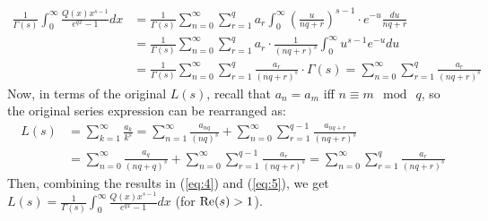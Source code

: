 \documentclass{article}
\begin{document}
\begin{equation}
    \label{eq:4}
    \begin{split}
        \frac{1}{\Gamma(s)}\int_{0}^{\infty}\frac{Q(x)x^{s-1}}{e^{qx}-1}dx &= \frac{1}{\Gamma(s)}\sum_{n=0}^{\infty}\sum_{r=1}^{q}a_r\int_{0}^{\infty}\left(\frac{u}{nq+r}\right)^{s-1}\cdot e^{-u}\frac{du}{nq+r}\\
        &= \frac{1}{\Gamma(s)}\sum_{n=0}^{\infty}\sum_{r=1}^{q}a_r\cdot\frac{1}{(nq+r)^s}\int_{0}^{\infty}u^{s-1}e^{-u}du\\
        &= \frac{1}{\Gamma(s)}\sum_{n=0}^{\infty}\sum_{r=1}^{q}\frac{a_{r}}{(nq+r)^s}\cdot\Gamma(s) = \sum_{n=0}^{\infty}\sum_{r=1}^{q}\frac{a_{r}}{(nq+r)^s}
    \end{split}
\end{equation}
Now, in terms of the original $L(s)$, recall that $a_n=a_m$ iff $n\equiv m\mod\ q$, so the original series expression can be rearranged as:
\begin{equation}
    \label{eq:5}
    \begin{split}
        L(s)&=\sum_{k=1}^{\infty}\frac{a_k}{k^s} = \sum_{n=1}^{\infty}\frac{a_{nq}}{(nq)^s}+\sum_{n=0}^{\infty}\sum_{r=1}^{q-1}\frac{a_{nq+r}}{(nq+r)^s}\\
        &=\sum_{n=0}^{\infty}\frac{a_{q}}{(nq+q)^s}+\sum_{n=0}^{\infty}\sum_{r=1}^{q-1}\frac{a_{r}}{(nq+r)^s} = \sum_{n=0}^{\infty}\sum_{r=1}^{q}\frac{a_r}{(nq+r)^s}
    \end{split}
\end{equation}
Then, combining the results in (\ref{eq:4}) and (\ref{eq:5}), we get $L(s)=\frac{1}{\Gamma(s)}\int_{0}^{\infty}\frac{Q(x)x^{s-1}}{e^{qx}-1}dx$ (for $\textmd{Re}(s)>1$).
\end{document}
